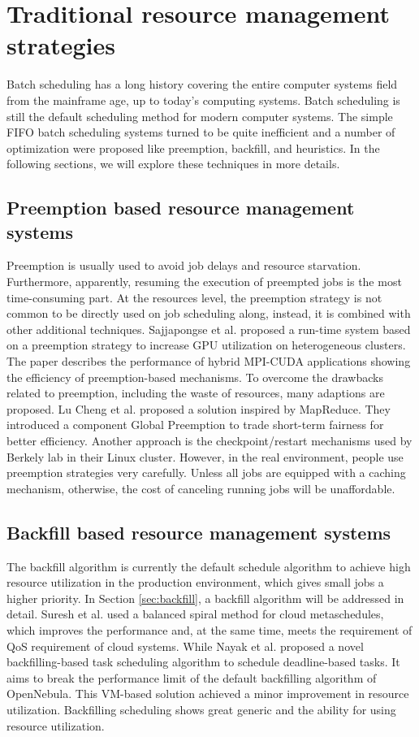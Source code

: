 \section{Traditional resource management strategies}
Batch scheduling has a long history covering the entire computer systems field from the mainframe age, up to today's computing systems. Batch scheduling is still the default scheduling method for modern computer systems. 
The simple FIFO batch scheduling systems turned to be quite inefficient and a number of optimization were proposed like preemption, backfill, and heuristics.
In the following sections, we will explore these techniques in more details.

\subsection{Preemption based resource management systems}
Preemption is usually used to avoid job delays and resource starvation. 
Furthermore, apparently, resuming the execution of preempted jobs is the most time-consuming part. 
At the resources level, the preemption strategy is not common to be directly used on job scheduling along, instead, it is combined with other additional techniques. 
Sajjapongse et al. \cite{sajjapongse2013preemption} proposed a run-time system based on a preemption strategy to increase GPU utilization on heterogeneous clusters. 
The paper describes the performance of hybrid MPI-CUDA applications showing the efficiency of preemption-based mechanisms. 
To overcome the drawbacks related to preemption, including the waste of resources, many adaptions are proposed. 
Lu Cheng et al. \cite{6103959} proposed a solution inspired by MapReduce. 
They introduced a component Global Preemption to trade short-term fairness for better efficiency. 
Another approach is the checkpoint/restart mechanisms used by Berkely lab\cite{hargrove2006berkeley} in their Linux cluster. 
However, in the real environment, people use preemption strategies very carefully. 
Unless all jobs are equipped with a caching mechanism, otherwise, the cost of canceling running jobs will be unaffordable.

\subsection{Backfill based resource management systems}
The backfill algorithm is currently the default schedule algorithm to achieve high resource utilization in the production environment, which gives small jobs a higher priority. 
In Section \ref{sec:backfill}, a backfill algorithm will be addressed in detail. 
Suresh et al. used a balanced spiral method for cloud metaschedules\cite{5972255}, which improves the performance and, at the same time, meets the requirement of QoS requirement of cloud systems.  
While Nayak et al. proposed a novel backfilling-based task scheduling algorithm to schedule deadline-based tasks\cite{nayak2019dynamic}. 
It aims to break the performance limit of the default backfilling algorithm of OpenNebula. 
This VM-based solution achieved a minor improvement in resource utilization. 
Backfilling scheduling shows great generic and the ability for using resource utilization.

